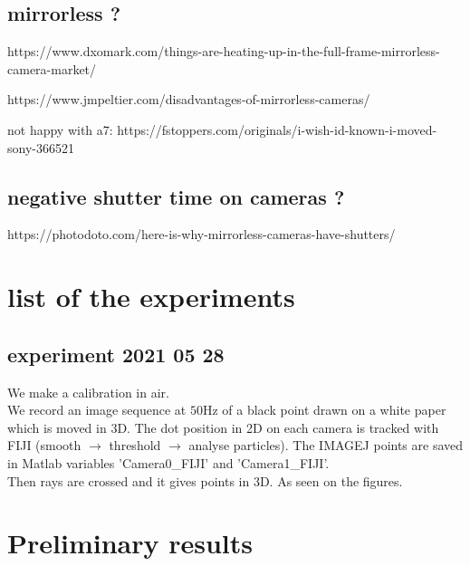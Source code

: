 \documentclass[twocolumn,amsmath,amssymb,floatfix]{article}
\begin{document}
\subsection{mirrorless ?}

https://www.dxomark.com/things-are-heating-up-in-the-full-frame-mirrorless-camera-market/

https://www.jmpeltier.com/disadvantages-of-mirrorless-cameras/

not happy with a7: https://fstoppers.com/originals/i-wish-id-known-i-moved-sony-366521


\subsection{negative shutter time on cameras ?}
https://photodoto.com/here-is-why-mirrorless-cameras-have-shutters/



\section{list of the experiments}

\subsection{experiment 2021 05 28}

We make a calibration in air.\\
We record an image sequence at $50$Hz of a black point drawn on a white paper which is moved in $3$D. The dot position in 2D on each camera is tracked with FIJI (smooth $\rightarrow$ threshold $\rightarrow$ analyse particles). The IMAGEJ points are saved in Matlab variables 'Camera0\_FIJI' and 'Camera1\_FIJI'. \\
Then rays are crossed and it gives points in 3D. As seen on the figures.

\section{Preliminary results}
\end{document}
